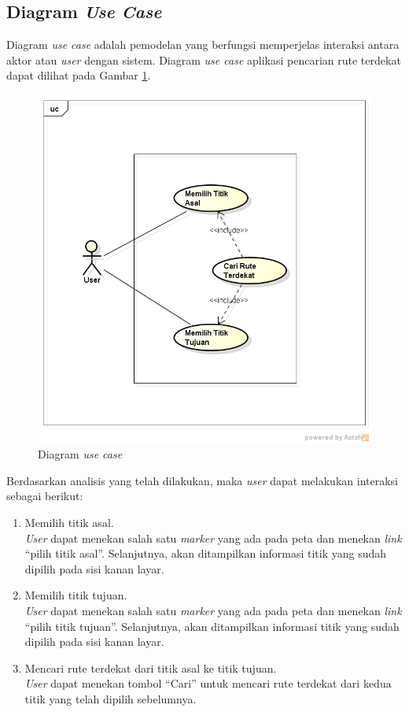 \subsection{Diagram \textit{Use Case}}
Diagram \textit{use case} adalah pemodelan yang berfungsi memperjelas interaksi
antara aktor atau \textit{user} dengan sistem. 
Diagram \textit{use case} aplikasi pencarian rute terdekat dapat dilihat pada
Gambar \ref{fig:usecase}.
\begin{figure}[h]
\centering
\includegraphics[scale=0.55]{Gambar/usecase}
\caption[Diagram Use Case]{Diagram \textit{use case}}
\label{fig:usecase}
\end{figure}

Berdasarkan analisis yang telah dilakukan, maka \textit{user} dapat melakukan
interaksi sebagai berikut:
\begin{enumerate}
  \item Memilih titik asal.\\
  \textit{User} dapat menekan salah satu \textit{marker} yang ada pada peta dan
  menekan \textit{link} ``pilih titik asal''. Selanjutnya, akan ditampilkan
  informasi titik yang sudah dipilih pada sisi kanan layar.
  
  \item Memilih titik tujuan.\\
  \textit{User} dapat menekan salah satu \textit{marker} yang ada pada peta dan
  menekan \textit{link} ``pilih titik tujuan''. Selanjutnya, akan ditampilkan
  informasi titik yang sudah dipilih pada sisi kanan layar.
  
  \item Mencari rute terdekat dari titik asal ke titik tujuan.\\
  \textit{User} dapat menekan tombol ``Cari'' untuk mencari rute terdekat dari
  kedua titik yang telah dipilih sebelumnya.
\end{enumerate}

